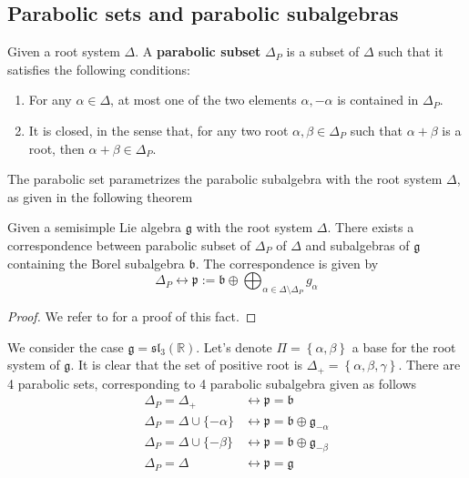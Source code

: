 \subsection{Parabolic sets and parabolic subalgebras}
\begin{definition}
    Given a root system $\Delta$. A \textbf{parabolic subset} $\Delta_P$ is a subset of $\Delta$ such that
    it satisfies the following conditions:
    \begin{enumerate}
        \item For any $\alpha \in \Delta$, at most one of the two elements $\alpha, - \alpha$ is contained in $\Delta_P$.
        \item It is closed, in the sense that, for any two root $\alpha,\beta \in \Delta_P$ such that $\alpha+\beta$ is a root, then $\alpha+\beta \in \Delta_P$.
    \end{enumerate}
\end{definition}
The parabolic set parametrizes the parabolic subalgebra with the root system $\Delta$, as given in the following theorem
\begin{theorem}
    Given a semisimple Lie algebra $\mathfrak{g}$ with the root system $\Delta$. There exists a correspondence between
    parabolic subset of $\Delta_P$ of $\Delta$ and subalgebras of $\mathfrak{g}$ containing the
    Borel subalgebra $\mathfrak{b}$. The correspondence is given by
    \[ \Delta_P \longleftrightarrow \mathfrak{p}:= \mathfrak{b}\oplus \bigoplus_{\alpha \in \Delta \setminus \Delta_P} g_{\alpha}\]
\end{theorem}
\begin{proof}
    We refer to \cite{} for a proof of this fact.
\end{proof}
\begin{example}
    We consider the case $\mathfrak{g} = \mathfrak{sl}_3(\mathbb{R})$. Let's denote
    $\Pi = \left\lbrace \alpha,\beta\right\rbrace$ a base for the root system of $\mathfrak{g}$. It is clear that
    the set of positive root is $\Delta_+=\left\lbrace \alpha,\beta,\gamma \right\rbrace$. There are
    4 parabolic sets, corresponding to 4 parabolic subalgebra given as follows
    \begin{align*}
        \Delta_P = \Delta_+                 & \longleftrightarrow \mathfrak{p} = \mathfrak{b}                               \\
        \Delta_{P} =\Delta \cup \{-\alpha\} & \longleftrightarrow \mathfrak{p} = \mathfrak{b} \oplus \mathfrak{g}_{-\alpha} \\
        \Delta_{P}= \Delta \cup \{-\beta\}  & \longleftrightarrow \mathfrak{p} = \mathfrak{b} \oplus \mathfrak{g}_{-\beta}  \\
        \Delta_P= \Delta                    & \longleftrightarrow \mathfrak{p} = \mathfrak{g}
    \end{align*}
\end{example}

